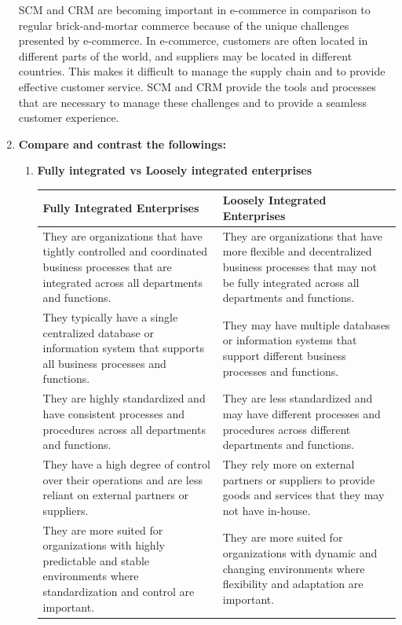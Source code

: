 \documentclass[12pt]{article}
\begin{document}
\begin{enumerate}
    SCM and CRM are becoming important in e-commerce in comparison to regular brick-and-mortar commerce because of the unique challenges presented by e-commerce. In e-commerce, customers are often located in different parts of the world, and suppliers may be located in different countries. This makes it difficult to manage the supply chain and to provide effective customer service. SCM and CRM provide the tools and processes that are necessary to manage these challenges and to provide a seamless customer experience.
    \item {\bfseries Compare and contrast the followings:}
    \begin{enumerate}
        \item {\bfseries Fully integrated vs Loosely integrated enterprises}
        \begin{longtable}{|p{6cm}|p{6cm}|}
                \hline
                \textbf{Fully Integrated Enterprises} & \textbf{Loosely Integrated Enterprises} \\
                \hline
                They are organizations that have tightly controlled and coordinated business processes that are integrated across all departments and functions. & They are organizations that have more flexible and decentralized business processes that may not be fully integrated across all departments and functions. \\
                \hline
                They typically have a single centralized database or information system that supports all business processes and functions. & They may have multiple databases or information systems that support different business processes and functions. \\
                \hline
                They are highly standardized and have consistent processes and procedures across all departments and functions. & They are less standardized and may have different processes and procedures across different departments and functions. \\
                \hline
                They have a high degree of control over their operations and are less reliant on external partners or suppliers. & They rely more on external partners or suppliers to provide goods and services that they may not have in-house. \\
                \hline
                They are more suited for organizations with highly predictable and stable environments where standardization and control are important. & They are more suited for organizations with dynamic and changing environments where flexibility and adaptation are important. \\

\end{longtable}
\end{enumerate}
\end{enumerate}
\end{document}
